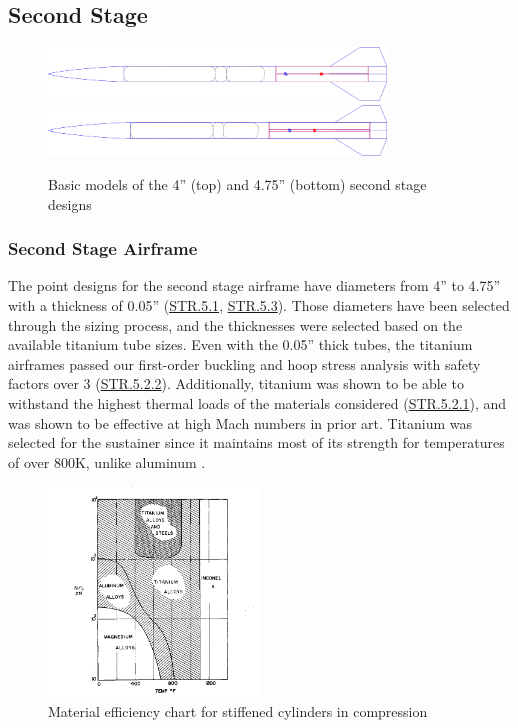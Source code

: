 \subsection{Second Stage}
\begin{figure}
    \centering
    \includegraphics[width=0.8\textwidth]{images/small-sustainer}
    \\ \vspace{0.5cm}
    \includegraphics[width=0.8\textwidth]{images/large-sustainer}
    \caption{Basic models of the 4'' (top) and 4.75'' (bottom) second stage designs}
    \label{figure:ork-sustainers}
\end{figure}


\subsubsection{Second Stage Airframe}
The point designs for the second stage airframe have diameters from 4'' to 4.75'' with a thickness of 0.05'' (\hyperlink{STR.5.1}{STR.5.1}, \hyperlink{STR.5.3}{STR.5.3}). Those diameters have been selected through the sizing process, and the thicknesses were selected based on the available titanium tube sizes. Even with the 0.05'' thick tubes, the titanium airframes passed our first-order buckling and hoop stress analysis with safety factors over 3 (\hyperlink{STR.5.2.2}{STR.5.2.2}). Additionally, titanium was shown to be able to withstand the highest thermal loads of the materials considered (\hyperlink{STR.5.2.1}{STR.5.2.1}), and was shown to be effective at high Mach numbers in prior art. Titanium was selected for the sustainer since it maintains most of its strength for temperatures of over 800K, unlike aluminum \cite{jsr}.

\begin{figure}
    \centering
    \includegraphics[width=0.5\textwidth]{images/temp-diagram}
    \caption{Material efficiency chart for stiffened cylinders in compression \cite{jsr}}
    \label{figure:temp-diagram}
\end{figure}


